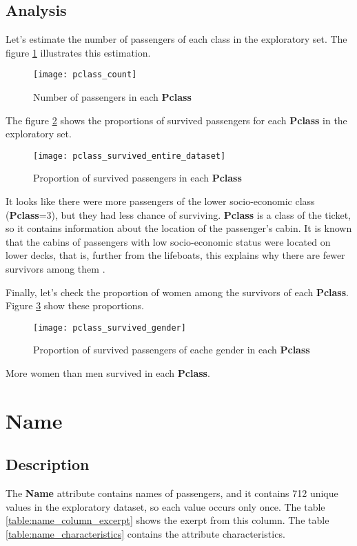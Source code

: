 \subsection{Analysis}
Let's estimate the number of passengers of each class in the exploratory
set. The figure \ref{pic:pclass_count} illustrates this estimation.

\begin{figure}[!hp]
    \centering
    \texttt{[image: pclass\_count]}
    \caption{Number of passengers in each \textbf{Pclass}}
    \label{pic:pclass_count}
\end{figure}

The figure \ref{pic:pclass_survived_entire_dataset} shows the proportions
of survived passengers for each \textbf{Pclass} in the exploratory set.

\begin{figure}[!hp]
    \centering
    \texttt{[image: pclass\_survived\_entire\_dataset]}
    \caption{Proportion of survived passengers in each \textbf{Pclass}}
    \label{pic:pclass_survived_entire_dataset}
\end{figure}

It looks like there were more passengers of the lower socio-economic class 
(\textbf{Pclass}=3), but they had less chance of surviving. \textbf{Pclass}
is a class of the ticket, so it contains information about the location 
of the passenger's cabin. It is known that the cabins of passengers with 
low socio-economic status were located on lower decks, that is, further 
from the lifeboats, this explains why there are fewer survivors among them
\cite{titanic-wikipedia}.

Finally, let's check the proportion of women among the survivors of each
\textbf{Pclass}. Figure \ref{pic:pclass_survived_gender} show these 
proportions.

\begin{figure}[!hp]
    \centering
    \texttt{[image: pclass\_survived\_gender]}
    \caption{Proportion of survived passengers of eache gender in each \textbf{Pclass}}
    \label{pic:pclass_survived_gender}
\end{figure}

More women than men survived in each \textbf{Pclass}.


\section{Name} \label{section:Name}
\subsection{Description}
The \textbf{Name} attribute contains names of passengers, and it contains
712 unique values in the exploratory dataset, so each value occurs only
once. The table \ref{table:name_column_excerpt} shows the exerpt from 
this column. The table \ref{table:name_characteristics} contains the 
attribute characteristics.


